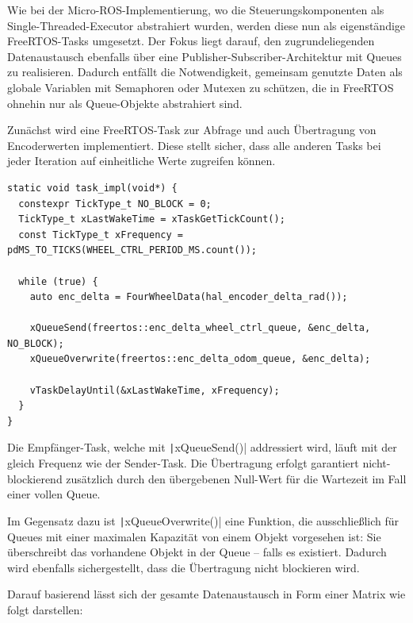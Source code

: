 Wie bei der Micro-ROS-Implementierung, wo die Steuerungskomponenten als
Single-Threaded-Executor abstrahiert wurden, werden diese nun als eigenständige
FreeRTOS-Tasks umgesetzt. Der Fokus liegt darauf, den zugrundeliegenden
Datenaustausch ebenfalls über eine Publisher-Subscriber-Architektur mit Queues
zu realisieren. Dadurch entfällt die Notwendigkeit, gemeinsam genutzte Daten als
globale Variablen mit Semaphoren oder Mutexen zu schützen, die in FreeRTOS
ohnehin nur als Queue-Objekte abstrahiert sind.

Zunächst wird eine FreeRTOS-Task zur Abfrage und auch Übertragung von
Encoderwerten implementiert. Diese stellt sicher, dass alle anderen Tasks bei
jeder Iteration auf einheitliche Werte zugreifen können.

\begin{code}
\begin{verbatim}
static void task_impl(void*) {
  constexpr TickType_t NO_BLOCK = 0;
  TickType_t xLastWakeTime = xTaskGetTickCount();
  const TickType_t xFrequency = pdMS_TO_TICKS(WHEEL_CTRL_PERIOD_MS.count());

  while (true) {
    auto enc_delta = FourWheelData(hal_encoder_delta_rad());

    xQueueSend(freertos::enc_delta_wheel_ctrl_queue, &enc_delta, NO_BLOCK);
    xQueueOverwrite(freertos::enc_delta_odom_queue, &enc_delta);

    vTaskDelayUntil(&xLastWakeTime, xFrequency);
  }
}
\end{verbatim}
    \label{code:enc_data_task}
\end{code}

Die Empfänger-Task, welche mit \texttt|xQueueSend()| addressiert wird,
läuft mit der gleich Frequenz wie der Sender-Task. Die Übertragung erfolgt
garantiert nicht-blockierend zusätzlich durch den übergebenen Null-Wert für die
Wartezeit im Fall einer vollen Queue.

Im Gegensatz dazu ist \texttt|xQueueOverwrite()| eine Funktion, die
ausschließlich für Queues mit einer maximalen Kapazität von einem Objekt
vorgesehen ist: Sie überschreibt das vorhandene Objekt in der Queue -- falls es
existiert. Dadurch wird ebenfalls sichergestellt, dass die Übertragung
nicht blockieren wird.

Darauf basierend lässt sich der gesamte Datenaustausch in Form einer Matrix wie
folgt darstellen:

